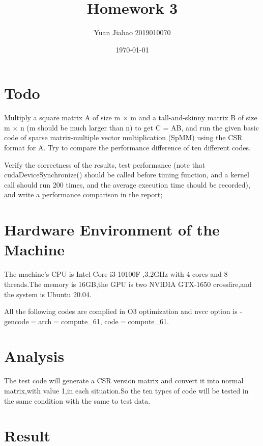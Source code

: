\documentclass[11pt]{scrartcl} %
\title{	
	Homework 3
}
\author{Yuan Jiahao 2019010070} %
\date{\normalsize\today} %
\begin{document}
\maketitle %


\section{Todo}
Multiply a square matrix A of size m $\times$ m and a tall-and-skinny matrix B of size m $\times$ n
(m should be much larger than n) to get C = AB, and run the given basic code of sparse
matrix-multiple vector multiplication (SpMM) using the CSR format for A. Try to compare the
performance difference of ten different codes.

Verify the correctness of the results, test performance (note that cudaDeviceSynchronize()
should be called before timing function, and a kernel call should run 200 times, and the average
execution time should be recorded), and write a performance comparison in the report;
\section{Hardware Environment of the Machine }
The machine's CPU is Intel Core i3-10100F ,3.2GHz with 4 cores and 8 threads.The memory is 16GB,the GPU is two NVIDIA GTX-1650 crossfire,and the system is Ubuntu 20.04.

All the following codes are complied in O3 optimization and nvcc option is -gencode$=$arch$=$compute\_61, code$=$compute\_61.
\section{Analysis}
The test code will generate a CSR version matrix and convert it into normal matrix,with value 1,in each situation.So the ten types of code will be tested in the same condition with the same to test data.
\section{Result}
\end{document}

